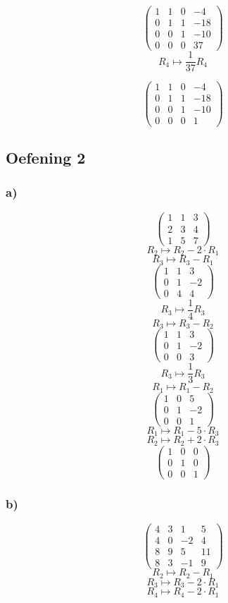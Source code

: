 \documentclass[lineaire_algebra_oplossingen.tex]{subfiles}
\begin{document}
$$
\begin{pmatrix}
1 & 1 & 0 & -4\\
0 & 1 & 1 & -18\\
0 & 0 & 1 & -10\\
0 & 0 & 0 & 37
\end{pmatrix}
$$
$$R_4 \longmapsto \frac{1}{37} R_4$$

$$
\begin{pmatrix}
1 & 1 & 0 & -4\\
0 & 1 & 1 & -18\\
0 & 0 & 1 & -10\\
0 & 0 & 0 & 1
\end{pmatrix}
$$
\subsection{Oefening 2}
\subsubsection*{a)}
\[
\begin{pmatrix}
1 &  1 &  3\\
2 &  3 &  4\\
1 &  5 &  7
\end{pmatrix}
\]
\[ R_2 \longmapsto R_2 -2\cdot R_1\]
\[ R_3 \longmapsto R_3 - R_1\]
\[
\begin{pmatrix}
1 &  1 &  3\\
0 &  1 &  -2\\
0 &  4 &  4
\end{pmatrix}
\]
\[ R_3 \longmapsto \frac{1}{4} R_3\]
\[ R_3 \longmapsto R_3 - R_2\]
\[
\begin{pmatrix}
1 &  1 &  3\\
0 &  1 &  -2\\
0 &  0 &  3
\end{pmatrix}
\]
\[ R_3 \longmapsto \frac{1}{3} R_3\]
\[ R_1 \longmapsto R_1 - R_2\]
\[
\begin{pmatrix}
1 &  0 &  5\\
0 &  1 &  -2\\
0 &  0 &  1
\end{pmatrix}
\]
\[ R_1 \longmapsto R_1 -5\cdot R_3\]
\[ R_2 \longmapsto R_2 +2\cdot R_3\]
\[
\begin{pmatrix}
1 &  0 &  0\\
0 &  1 &  0\\
0 &  0 &  1
\end{pmatrix}
\]
\subsubsection*{b)}
\[
\begin{pmatrix}
4 & 3 & 1 & 5\\
4 & 0 & -2 & 4\\
8 & 9 & 5 & 11\\
8 & 3 & -1 & 9
\end{pmatrix}
\]
\[ R_2 \longmapsto R_2 - R_1 \]
\[ R_3 \longmapsto R_3 - 2\cdot R_1\]
\[ R_4 \longmapsto R_4 - 2\cdot R_1\]
\end{document}
